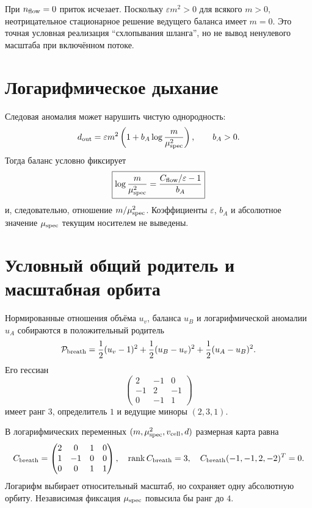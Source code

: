 При $n_{\rm flow}=0$ приток исчезает. Поскольку
$\varepsilon m^2>0$ для всякого $m>0$, неотрицательное стационарное решение
ведущего баланса имеет $m=0$. Это точная условная реализация ``схлопывания
шланга'', но не вывод ненулевого масштаба при включённом потоке.

\section{Логарифмическое дыхание}

Следовая аномалия может нарушить чистую однородность:
\begin{equation}
 d_{\rm out}
 =\varepsilon m^2
 \left(1+b_A\log\frac{m}{\mu_{\rm spec}^2}\right),
 \qquad b_A>0.
 \label{eq:v10-breathing-log-output}
\end{equation}
Тогда баланс условно фиксирует
\begin{equation}
 \boxed{
 \log\frac{m}{\mu_{\rm spec}^2}
 =\frac{C_{\rm flow}/\varepsilon-1}{b_A}}
 \label{eq:v10-breathing-relative-scale}
\end{equation}
и, следовательно, отношение $m/\mu_{\rm spec}^2$. Коэффициенты
$\varepsilon$, $b_A$ и абсолютное значение $\mu_{\rm spec}$ текущим
носителем не выведены.

\section{Условный общий родитель и масштабная орбита}

Нормированные отношения объёма $u_v$, баланса $u_B$ и логарифмической
аномалии $u_A$ собираются в положительный родитель
\begin{equation}
 \mathcal P_{\rm breath}
 =\frac12(u_v-1)^2
 +\frac12(u_B-u_v)^2
 +\frac12(u_A-u_B)^2.
 \label{eq:v10-breathing-parent}
\end{equation}
Его гессиан
\begin{equation}
 \begin{pmatrix}2&-1&0\\-1&2&-1\\0&-1&1\end{pmatrix}
\end{equation}
имеет ранг $3$, определитель $1$ и ведущие миноры $(2,3,1)$.

В логарифмических переменных
$(m,\mu_{\rm spec}^2,v_{\rm cell},d)$ размерная карта равна
\begin{equation}
 C_{\rm breath}=
 \begin{pmatrix}
 2&0&1&0\\
 1&-1&0&0\\
 0&0&1&1
 \end{pmatrix},
 \quad \operatorname{rank} C_{\rm breath}=3,
 \quad C_{\rm breath}(-1,-1,2,-2)^T=0.
 \label{eq:v10-breathing-scale-map}
\end{equation}
Логарифм выбирает относительный масштаб, но сохраняет одну абсолютную
орбиту. Независимая фиксация $\mu_{\rm spec}$ повысила бы ранг до $4$.

